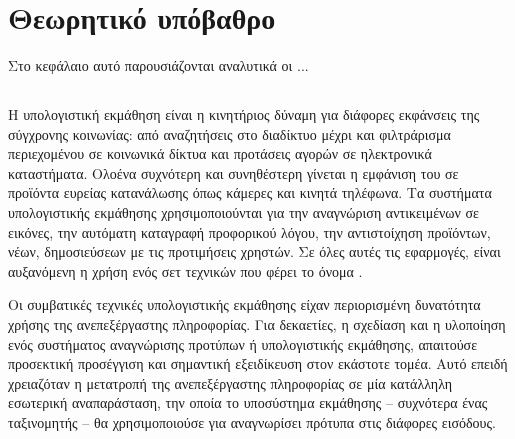 \chapter{Θεωρητικό υπόβαθρο}

Στο κεφάλαιο αυτό παρουσιάζονται αναλυτικά οι ...

\section{}

Η υπολογιστική εκμάθηση  είναι η κινητήριος δύναμη για διάφορες εκφάνσεις της σύγχρονης κοινωνίας: από αναζητήσεις στο διαδίκτυο μέχρι και φιλτράρισμα περιεχομένου σε κοινωνικά δίκτυα και προτάσεις αγορών σε ηλεκτρονικά καταστήματα. Ολοένα συχνότερη και συνηθέστερη γίνεται η εμφάνιση του σε προϊόντα ευρείας κατανάλωσης όπως κάμερες και κινητά τηλέφωνα. Τα συστήματα υπολογιστικής εκμάθησης χρησιμοποιούνται για την αναγνώριση αντικειμένων σε εικόνες, την αυτόματη καταγραφή προφορικού λόγου, την αντιστοίχηση προϊόντων, νέων, δημοσιεύσεων με τις προτιμήσεις χρηστών. Σε όλες αυτές τις εφαρμογές, είναι αυξανόμενη η χρήση ενός σετ τεχνικών που φέρει το όνομα .

Οι συμβατικές τεχνικές υπολογιστικής εκμάθησης είχαν περιορισμένη δυνατότητα χρήσης της ανεπεξέργαστης πληροφορίας. Για δεκαετίες, η σχεδίαση και η υλοποίηση ενός συστήματος αναγνώρισης προτύπων ή υπολογιστικής εκμάθησης, απαιτούσε προσεκτική προσέγγιση και σημαντική εξειδίκευση στον εκάστοτε τομέα. Αυτό επειδή χρειαζόταν η μετατροπή της ανεπεξέργαστης πληροφορίας σε μία κατάλληλη εσωτερική αναπαράσταση, την οποία το υποσύστημα εκμάθησης -- συχνότερα ένας ταξινομητής -- θα χρησιμοποιούσε για αναγνωρίσει πρότυπα στις διάφορες εισόδους.

